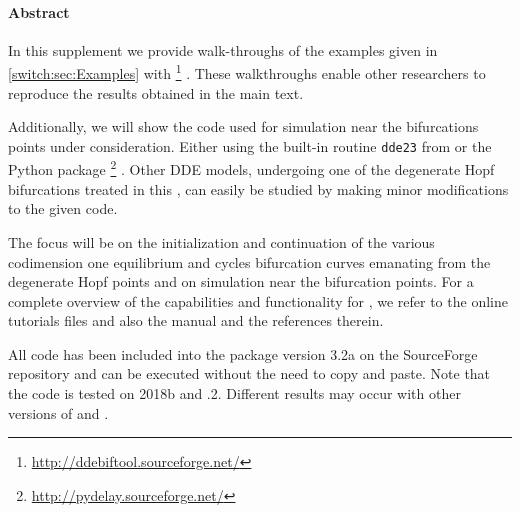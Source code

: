 \paragraph{{\color{header1}Abstract}}
In this supplement we provide walk-throughs of the examples given in \cref{switch:sec:Examples} with \DDEBIFTOOL\footnote{\url{http://ddebiftool.sourceforge.net/}} \cite{DDEBIFTOOL}. These walkthroughs enable other researchers to reproduce the results obtained in the main text.

Additionally, we will show the code used for simulation near the bifurcations
points under consideration. Either using the built-in routine \lstinline|dde23|
from \MATLAB \cite{Shampine01solvingdelay} or the Python package
\PYDELAY\footnote{\url{http://pydelay.sourceforge.net/}}
\cite{Flunkert2009Flunkert}. Other DDE models, undergoing one of the degenerate
Hopf bifurcations treated in this \paper{}, can easily be studied by making minor
modifications to the given code.

The focus will be on the initialization and continuation of the various codimension one equilibrium and cycles bifurcation curves emanating from the degenerate Hopf points and on simulation near the bifurcation points. For a complete overview of the capabilities and functionality for \DDEBIFTOOL, we refer to the online tutorials files and also the manual and the references therein.

All code has been included into the \DDEBIFTOOL package version 3.2a on the SourceForge repository and can be executed without the need to copy and paste. Note that the code is tested on \MATLAB 2018b and .2. Different results may occur with other versions of \MATLAB and \OCTAVE.

